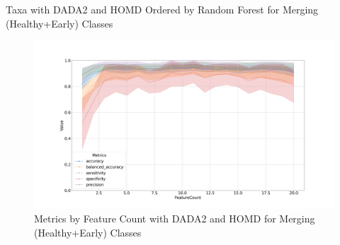 \documentclass[a4paper]{article}
\begin{document}
            \begin{table}[p]
                \centering
                \caption{Taxa with DADA2 and HOMD Ordered by Random Forest for Merging (Healthy+Early) Classes}
                \label{tb:RF-HE-DADA2-homd}

            \end{table}

            \begin{figure}[p]
                \centering
                \includegraphics[width=0.7 \linewidth]{figures/RandomForest/one.DADA2.homd/metrics.png}
                \caption{Metrics by Feature Count with DADA2 and HOMD for Merging (Healthy+Early) Classes}
                \label{fig:RF-HE-metrics-DADA2-homd}
            \end{figure}
\end{document}
